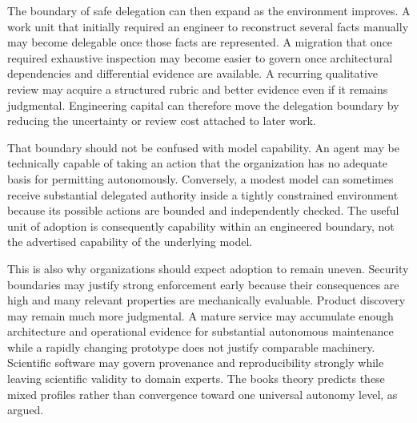 The boundary of safe delegation can then expand as the environment improves. A work unit that initially required an engineer to reconstruct several facts manually may become delegable once those facts are represented. A migration that once required exhaustive inspection may become easier to govern once architectural dependencies and differential evidence are available. A recurring qualitative review may acquire a structured rubric and better evidence even if it remains judgmental. Engineering capital can therefore move the delegation boundary by reducing the uncertainty or review cost attached to later work.

That boundary should not be confused with model capability. An agent may be technically capable of taking an action that the organization has no adequate basis for permitting autonomously. Conversely, a modest model can sometimes receive substantial delegated authority inside a tightly constrained environment because its possible actions are bounded and independently checked. The useful unit of adoption is consequently capability within an engineered boundary, not the advertised capability of the underlying model.

This is also why organizations should expect adoption to remain uneven. Security boundaries may justify strong enforcement early because their consequences are high and many relevant properties are mechanically evaluable. Product discovery may remain much more judgmental. A mature service may accumulate enough architecture and operational evidence for substantial autonomous maintenance while a rapidly changing prototype does not justify comparable machinery. Scientific software may govern provenance and reproducibility strongly while leaving scientific validity to domain experts. The book\textquotesingle s theory predicts these mixed profiles rather than convergence toward one universal autonomy level, as  argued.
